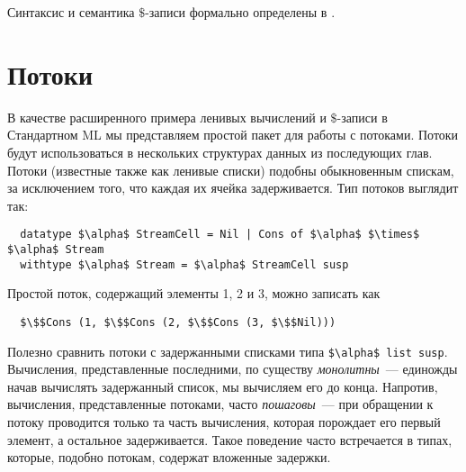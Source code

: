 Синтаксис и семантика $\$$-записи формально определены в
\cite{Okasaki1996a}.

\section{Потоки}
\label{sc:4-2}

В качестве расширенного примера ленивых вычислений и $\$$-записи в
Стандартном ML мы представляем простой пакет для работы с
потоками. Потоки будут использоваться в нескольких структурах данных
из последующих глав.
Потоки (известные также как ленивые списки) подобны обыкновенным
спискам, за исключением того, что каждая их ячейка задерживается. Тип
потоков выглядит так:
\begin{lstlisting}
  datatype $\alpha$ StreamCell = Nil | Cons of $\alpha$ $\times$ $\alpha$ Stream
  withtype $\alpha$ Stream = $\alpha$ StreamCell susp
\end{lstlisting}
Простой поток, содержащий элементы 1, 2 и 3, можно записать как
\begin{lstlisting}
  $\$$Cons (1, $\$$Cons (2, $\$$Cons (3, $\$$Nil)))
\end{lstlisting}

Полезно сравнить потоки с задержанными списками типа
\lstinline!$\alpha$ list susp!. Вычисления, представленные последними,
по существу {\em монолитны}~--- единожды начав вычислять задержанный
список, мы вычисляем его до конца. Напротив, вычисления,
представленные потоками, часто {\em пошаговы}~--- при обращении к
потоку проводится только та часть вычисления, которая порождает его
первый элемент, а остальное задерживается. Такое поведение часто
встречается в типах, которые, подобно потокам, содержат вложенные
задержки.

